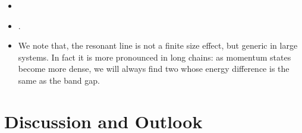 \documentclass[10pt,
 amsmath,amssymb,
 aps,prb, twocolumn
]{revtex4-2}
\begin{document}
\begin{itemize}
  \item {}

  \item {}.

  \item We note that, the resonant line is not a finite size effect, but generic in large systems. In fact it is more pronounced in long chains: as momentum states become more dense, we will always find two whose energy difference is the same as the band gap.
\end{itemize}

\section{Discussion and Outlook}\label{sect:outlook}
\end{document}
